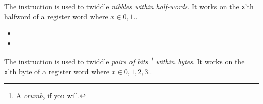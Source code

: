 \ienc{\ienctwidnzero\ienctwidnone}

The  instruction is used to twiddle {\em nibbles within 
half-words}.
It works on the {\tt x}'th halfword of a register word where
$x\in{0,1}.$.

\begin{itemize}
\item {}
\item {}
\end{itemize}

\ienc{\ienctwidczero\ienctwidcone\ienctwidctwo\ienctwidcthree}

The  instruction is used to twiddle {\em pairs of bits
\footnote{A {\em crumb}, if you will.}
within bytes}.
It works on the {\tt x}'th byte of a register word where
$x\in{0,1,2,3}.$.

